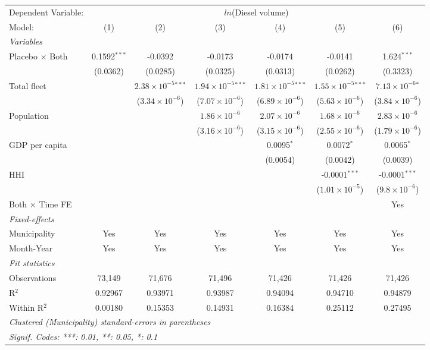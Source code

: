 \documentclass[
]{article}
\begin{document}
\begin{tabular}{lcccccc}
\tabularnewline\midrule\midrule
Dependent Variable:&\multicolumn{6}{c}{$ln$(Diesel volume)}\\
Model:&(1) & (2) & (3) & (4) & (5) & (6)\\
\midrule \emph{Variables}&   &   &   &   &   &  \\
Placebo $\times $ Both & 0.1592$^{***}$ & -0.0392 & -0.0173 & -0.0174 & -0.0141 & 1.624$^{***}$\\
  &(0.0362) & (0.0285) & (0.0325) & (0.0313) & (0.0262) & (0.3323)\\
Total fleet &    & $2.38\times 10^{-5}$$^{***}$ & $1.94\times 10^{-5}$$^{***}$ & $1.81\times 10^{-5}$$^{***}$ & $1.55\times 10^{-5}$$^{***}$ & $7.13\times 10^{-6}$$^{*}$\\
  &   & ($3.34\times 10^{-6}$) & ($7.07\times 10^{-6}$) & ($6.89\times 10^{-6}$) & ($5.63\times 10^{-6}$) & ($3.84\times 10^{-6}$)\\
Population &    &    & $1.86\times 10^{-6}$ & $2.07\times 10^{-6}$ & $1.68\times 10^{-6}$ & $2.83\times 10^{-6}$\\
  &   &    & ($3.16\times 10^{-6}$) & ($3.15\times 10^{-6}$) & ($2.55\times 10^{-6}$) & ($1.79\times 10^{-6}$)\\
GDP per capita &    &    &    & 0.0095$^{*}$ & 0.0072$^{*}$ & 0.0065$^{*}$\\
  &   &    &    & (0.0054) & (0.0042) & (0.0039)\\
HHI &    &    &    &    & -0.0001$^{***}$ & -0.0001$^{***}$\\
  &   &    &    &    & ($1.01\times 10^{-5}$) & ($9.8\times 10^{-6}$)\\
Both $\times$ Time FE &  &  &  &  &  & Yes\\
\midrule \emph{Fixed-effects}&   &   &   &   &   &  \\
Municipality & Yes & Yes & Yes & Yes & Yes & Yes\\
Month-Year & Yes & Yes & Yes & Yes & Yes & Yes\\
\midrule \emph{Fit statistics}&  & & & & & \\
Observations & 73,149&71,676&71,496&71,426&71,426&71,426\\
R$^2$ & 0.92967&0.93971&0.93987&0.94094&0.94710&0.94879\\
Within R$^2$ & 0.00180&0.15353&0.14931&0.16384&0.25112&0.27495\\
\midrule\midrule\multicolumn{7}{l}{\emph{Clustered (Municipality) standard-errors in parentheses}}\\
\multicolumn{7}{l}{\emph{Signif. Codes: ***: 0.01, **: 0.05, *: 0.1}}\\
\end{tabular}
\end{document}
